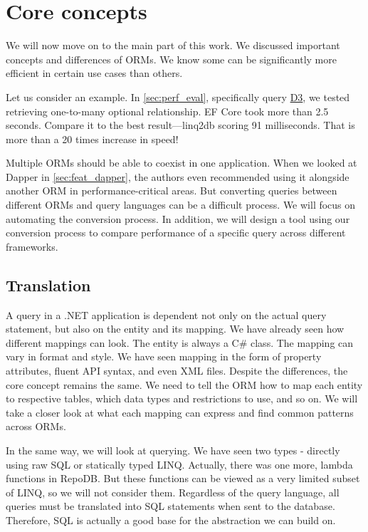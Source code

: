 \chapter{Core concepts}


We will now move on to the main part of this work. We discussed important concepts and differences of ORMs. We know some can be significantly more efficient in certain use cases than others. 

Let us consider an example. In \autoref{sec:perf_eval}, specifically query \hyperref[query:d3]{D3}, we tested retrieving one-to-many optional relationship.
EF Core took more than 2.5 seconds. Compare it to the best result---linq2db scoring 91 milliseconds. That is more than a 20 times increase in speed! 

Multiple ORMs should be able to coexist in one application. When we looked at Dapper in \autoref{sec:feat_dapper}, the authors even recommended using it alongside another ORM in performance-critical areas. But converting queries between different ORMs and query languages can be a difficult process. We will focus on automating the conversion process. In addition, we will design a tool using our conversion process to compare performance of a specific query across different frameworks.

\section{Translation}

A query in a .NET application is dependent not only on the actual query statement, but also on the entity and its mapping. We have already seen how different mappings can look. The entity is always a C\# class. The mapping can vary in format and style. We have seen mapping in the form of property attributes, fluent API syntax, and even XML files. Despite the differences, the core concept remains the same. We need to tell the ORM how to map each entity to respective tables, which data types and restrictions to use, and so on. We will take a closer look at what each mapping can express and find common patterns across ORMs. 

In the same way, we will look at querying. We have seen two types - directly using raw SQL or statically typed LINQ. Actually, there was one more, lambda functions in RepoDB. But these functions can be viewed as a very limited subset of LINQ, so we will not consider them. Regardless of the query language, all queries must be translated into SQL statements when sent to the database. Therefore, SQL is actually a good base for the abstraction we can build on.

